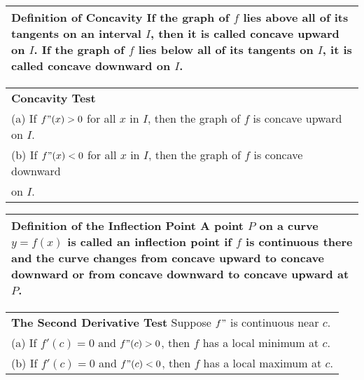 \documentclass{article}
\begin{document}
\begin{center}
\large
\def\arraystretch{1.3}
{\setlength{\tabcolsep}{16pt}
\begin{tabularx}{.9\textwidth}{|X|}
\hline
	\textbf{Definition of Concavity} \: If the graph of $f$ lies above all of its tangents on an interval $I$, then it is called \textbf{concave upward} on $I$. If the graph of $f$ lies below all of its tangents on $I$, it is called \textbf{concave downward} on $I$. \\
\hline
\end{tabularx}}
\vspace{16pt}

\large
\def\arraystretch{1.3}
{\setlength{\tabcolsep}{16pt}
\begin{tabularx}{.9\textwidth}{|X|}
\hline
	\textbf{Concavity Test} \\
	(a) If $f"(x) > 0$ for all $x$ in $I$, then the graph of $f$ is concave upward on $I$. \\
	(b) If $f"(x) < 0$ for all $x$ in $I$, then the graph of $f$ is concave downward \\ \hspace{16pt} on $I$. \\
\hline
\end{tabularx}}
\vspace{16pt}

\large
\def\arraystretch{1.3}
{\setlength{\tabcolsep}{16pt}
\begin{tabularx}{.9\textwidth}{|X|}
\hline
	\textbf{Definition of the Inflection Point} \: A point $P$ on a curve $y=f(x)$ is called an \textbf{inflection point} if $f$ is continuous there and the curve changes from concave upward to concave downward or from concave downward to concave upward at $P$. \\
\hline
\end{tabularx}}
\vspace{16pt}

\large
\def\arraystretch{1.3}
{\setlength{\tabcolsep}{16pt}
\begin{tabularx}{.9\textwidth}{|X|}
\hline
	\textbf{The Second Derivative Test} \: Suppose $f"$ is continuous near $c$. \\
	(a) If $f'(c) = 0$ and $f"(c) > 0$, then $f$ has a local minimum at $c$. \\
	(b) If $f'(c) = 0$ and $f"(c) < 0$, then $f$ has a local maximum at $c$. \\
\hline
\end{tabularx}}
\vspace{16pt}
\end{center}
\pagebreak
\end{document}
